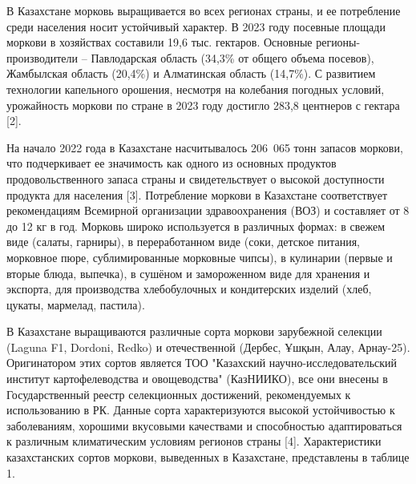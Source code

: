\begin{multicols}{2}
В Казахстане морковь выращивается во всех регионах страны, и ее
потребление среди населения носит устойчивый характер. В 2023 году
посевные площади моркови в хозяйствах составили 19,6 тыс. гектаров.
Основные регионы-производители -- Павлодарская область (34,3\% от общего
объема посевов), Жамбылская область (20,4\%) и Алматинская область
(14,7\%). С развитием технологии капельного орошения, несмотря на
колебания погодных условий, урожайность моркови по стране в 2023 году
достигло 283,8 центнеров с гектара {[}2{]}.

На начало 2022 года в Казахстане насчитывалось 206~065 тонн запасов
моркови, что подчеркивает ее значимость как одного из основных продуктов
продовольственного запаса страны и свидетельствует о высокой доступности
продукта для населения {[}3{]}. Потребление моркови в Казахстане
соответствует рекомендациям Всемирной организации здравоохранения (ВОЗ)
и составляет от 8 до 12 кг в год. Морковь широко используется в
различных формах: в свежем виде (салаты, гарниры), в переработанном виде
(соки, детское питания, морковное пюре, сублимированные морковные
чипсы), в кулинарии (первые и вторые блюда, выпечка), в сушёном и
замороженном виде для хранения и экспорта, для производства
хлебобулочных и кондитерских изделий (хлеб, цукаты, мармелад, пастила).

В Казахстане выращиваются различные сорта моркови зарубежной селекции
(Laguna F1, Dordoni, Redko) и отечественной (Дербес, Ұшқын, Алау,
Арнау-25). Оригинатором этих сортов является ТОО "Казахский
научно-исследовательский институт картофелеводства и овощеводства"
(КазНИИКО), все они внесены в Государственный реестр селекционных
достижений, рекомендуемых к использованию в РК. Данные сорта
характеризуются высокой устойчивостью к заболеваниям, хорошими вкусовыми
качествами и способностью адаптироваться к различным климатическим
условиям регионов страны {[}4{]}. Характеристики казахстанских сортов
моркови, выведенных в Казахстане, представлены в таблице 1.
\end{multicols}

